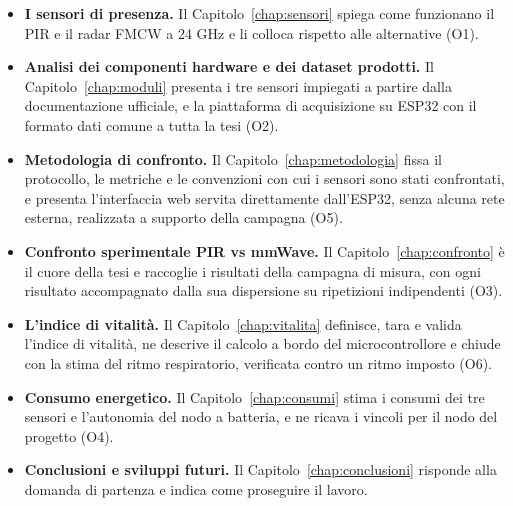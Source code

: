 \begin{itemize}
    \item \textbf{I sensori di presenza.} Il Capitolo~\ref{chap:sensori} spiega come funzionano il PIR e il radar FMCW a 24 GHz e li colloca rispetto alle alternative (O1).
    
    \item \textbf{Analisi dei componenti hardware e dei dataset prodotti.} Il Capitolo~\ref{chap:moduli} presenta i tre sensori impiegati a partire dalla documentazione ufficiale, e la piattaforma di acquisizione su ESP32 con il formato dati comune a tutta la tesi (O2).
    
    \item \textbf{Metodologia di confronto.} Il Capitolo~\ref{chap:metodologia} fissa il protocollo, le metriche e le convenzioni con cui i sensori sono stati confrontati, e presenta l'interfaccia web servita direttamente dall'ESP32, senza alcuna rete esterna, realizzata a supporto della campagna (O5).

    \item \textbf{Confronto sperimentale PIR vs mmWave.} Il Capitolo~\ref{chap:confronto} è il cuore della tesi e raccoglie i risultati della campagna di misura, con ogni risultato accompagnato dalla sua dispersione su ripetizioni indipendenti (O3).

    \item \textbf{L'indice di vitalità.} Il Capitolo~\ref{chap:vitalita} definisce, tara e valida l'indice di vitalità, ne descrive il calcolo a bordo del microcontrollore e chiude con la stima del ritmo respiratorio, verificata contro un ritmo imposto (O6).

    \item \textbf{Consumo energetico.} Il Capitolo~\ref{chap:consumi} stima i consumi dei tre sensori e l'autonomia del nodo a batteria, e ne ricava i vincoli per il nodo del progetto (O4).

    \item \textbf{Conclusioni e sviluppi futuri.} Il Capitolo~\ref{chap:conclusioni} risponde alla domanda di partenza e indica come proseguire il lavoro.
\end{itemize}